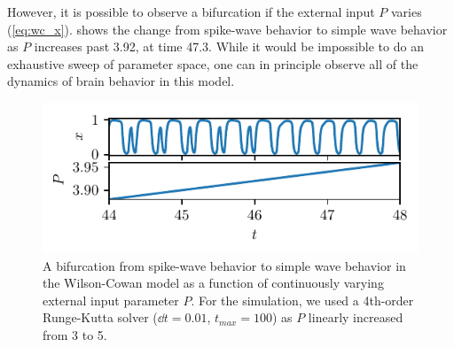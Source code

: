However, it is possible to observe a bifurcation if the external input $P$ varies (\cref{eq:wc_x}).
 shows the change from spike-wave behavior to simple wave behavior as $P$ increases past 3.92, at time 47.3.
While it would be impossible to do an exhaustive sweep of parameter space, one can in principle observe all of the dynamics of brain behavior in this model.
\begin{figure}[ht]
  \centering
  \includegraphics[width=\columnwidth]{figure/wc_bifurcation.pdf}
  \caption[Wilson-Cowan bifurcation]{A bifurcation from spike-wave behavior to simple wave behavior in the Wilson-Cowan model as a function of continuously varying external input parameter $P$.
    For the simulation, we used a 4th-order Runge-Kutta solver ($\dd{t} = 0.01$, $t_{max} = 100$) as $P$ linearly increased from 3 to 5.
  }
  \label{fig:wc_bifurcation}
\end{figure}

